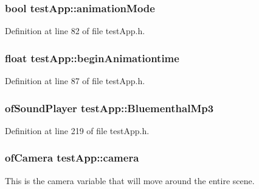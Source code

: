 \hypertarget{classtest_app_a2a5d49fd1f7f50f745f56095a1fa0099}{
\subsubsection[{animation\-Mode}]{\setlength{\rightskip}{0pt plus 5cm}bool test\-App\-::animation\-Mode}}\label{classtest_app_a2a5d49fd1f7f50f745f56095a1fa0099}


Definition at line 82 of file test\-App.\-h.

\hypertarget{classtest_app_adcaa52132409ab0ad077236f9e6fa180}{
\subsubsection[{begin\-Animationtime}]{\setlength{\rightskip}{0pt plus 5cm}float test\-App\-::begin\-Animationtime}}\label{classtest_app_adcaa52132409ab0ad077236f9e6fa180}


Definition at line 87 of file test\-App.\-h.

\hypertarget{classtest_app_af696fd13ee9ecb38ac0ba0b72543ce06}{
\subsubsection[{Bluementhal\-Mp3}]{\setlength{\rightskip}{0pt plus 5cm}of\-Sound\-Player test\-App\-::\-Bluementhal\-Mp3}}\label{classtest_app_af696fd13ee9ecb38ac0ba0b72543ce06}


Definition at line 219 of file test\-App.\-h.

\hypertarget{classtest_app_a0278ee237cbbd881252d6273b131bb55}{
\subsubsection[{camera}]{\setlength{\rightskip}{0pt plus 5cm}of\-Camera test\-App\-::camera}}\label{classtest_app_a0278ee237cbbd881252d6273b131bb55}


This is the camera variable that will move around the entire scene. 



